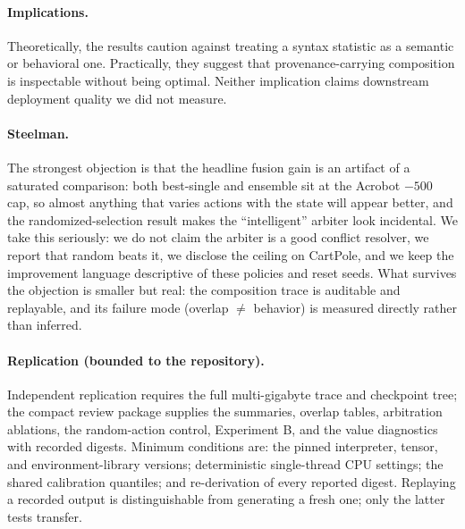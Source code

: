\documentclass[11pt]{article}
\begin{document}
\paragraph{Implications.}
Theoretically, the results caution against treating a syntax statistic as a semantic or behavioral
one. Practically, they suggest that provenance-carrying composition is inspectable without being
optimal. Neither implication claims downstream deployment quality we did not measure.

\paragraph{Steelman.}
The strongest objection is that the headline fusion gain is an artifact of a saturated comparison:
both best-single and ensemble sit at the Acrobot $-500$ cap, so almost anything that varies actions
with the state will appear better, and the randomized-selection result makes the ``intelligent''
arbiter look incidental. We take this seriously: we do not claim the arbiter is a good conflict
resolver, we report that random beats it, we disclose the ceiling on CartPole, and we keep the
improvement language descriptive of these policies and reset seeds. What survives the objection is
smaller but real: the composition trace is auditable and replayable, and its failure mode
(overlap $\neq$ behavior) is measured directly rather than inferred.

\paragraph{Replication (bounded to the repository).}
Independent replication requires the full multi-gigabyte trace and checkpoint tree; the compact
review package supplies the summaries, overlap tables, arbitration ablations, the random-action
control, Experiment B, and the value diagnostics with recorded digests. Minimum conditions are:
the pinned interpreter, tensor, and environment-library versions; deterministic single-thread CPU
settings; the shared calibration quantiles; and re-derivation of every reported digest. Replaying
a recorded output is distinguishable from generating a fresh one; only the latter tests transfer.
\end{document}
